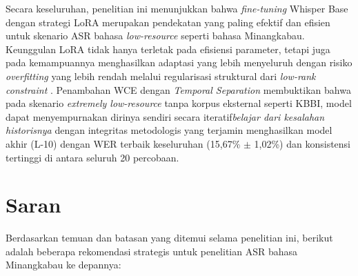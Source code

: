 Secara keseluruhan, penelitian ini menunjukkan bahwa \textit{fine-tuning} Whisper Base dengan strategi LoRA merupakan pendekatan yang paling efektif dan efisien untuk skenario ASR bahasa \textit{low-resource} seperti bahasa Minangkabau. Keunggulan LoRA tidak hanya terletak pada efisiensi parameter, tetapi juga pada kemampuannya menghasilkan adaptasi yang lebih menyeluruh dengan risiko \textit{overfitting} yang lebih rendah melalui regularisasi struktural dari \textit{low-rank constraint} \cite{hu2022lora, song2024lorawhisper}. Penambahan WCE dengan \textit{Temporal Separation} membuktikan bahwa pada skenario \textit{extremely low-resource} tanpa korpus eksternal seperti KBBI, model dapat menyempurnakan dirinya sendiri secara iteratif\textit{belajar dari kesalahan historisnya} dengan integritas metodologis yang terjamin menghasilkan model akhir (L-10) dengan WER terbaik keseluruhan (15,67\% $\pm$ 1,02\%) dan konsistensi tertinggi di antara seluruh 20 percobaan.


\section{Saran} \label{V.Saran}

Berdasarkan temuan dan batasan yang ditemui selama penelitian ini, berikut adalah beberapa rekomendasi strategis untuk penelitian ASR bahasa Minangkabau ke depannya:


